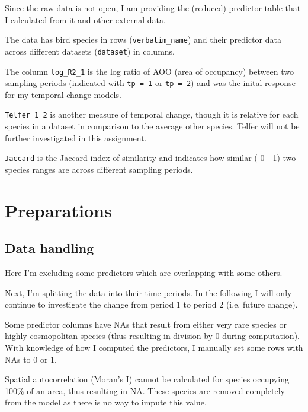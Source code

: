 \documentclass[
  letterpaper,
  DIV=11,
  numbers=noendperiod]{scrartcl}
\begin{document}
Since the raw data is not open, I am providing the (reduced) predictor
table that I calculated from it and other external data.

The data has bird species in rows (\texttt{verbatim\_name}) and their
predictor data across different datasets (\texttt{dataset}) in columns.

The column \texttt{log\_R2\_1} is the log ratio of AOO (area of
occupancy) between two sampling periods (indicated with
\texttt{tp\ =\ 1} or \texttt{tp\ =\ 2}) and was the inital response for
my temporal change models.

\texttt{Telfer\_1\_2} is another measure of temporal change, though it
is relative for each species in a dataset in comparison to the average
other species. Telfer will not be further investigated in this
assignment.

\texttt{Jaccard} is the Jaccard index of similarity and indicates how
similar ( 0 - 1) two species ranges are across different sampling
periods.

\section{Preparations}\label{preparations}

\subsection{Data handling}\label{data-handling}

Here I'm excluding some predictors which are overlapping with some
others.

Next, I'm splitting the data into their time periods. In the following I
will only continue to investigate the change from period 1 to period 2
(i.e, future change).

Some predictor columns have NAs that result from either very rare
species or highly cosmopolitan species (thus resulting in division by 0
during computation). With knowledge of how I computed the predictors, I
manually set some rows with NAs to 0 or 1.

Spatial autocorrelation (Moran's I) cannot be calculated for species
occupying 100\% of an area, thus resulting in NA. These species are
removed completely from the model as there is no way to impute this
value.
\end{document}
